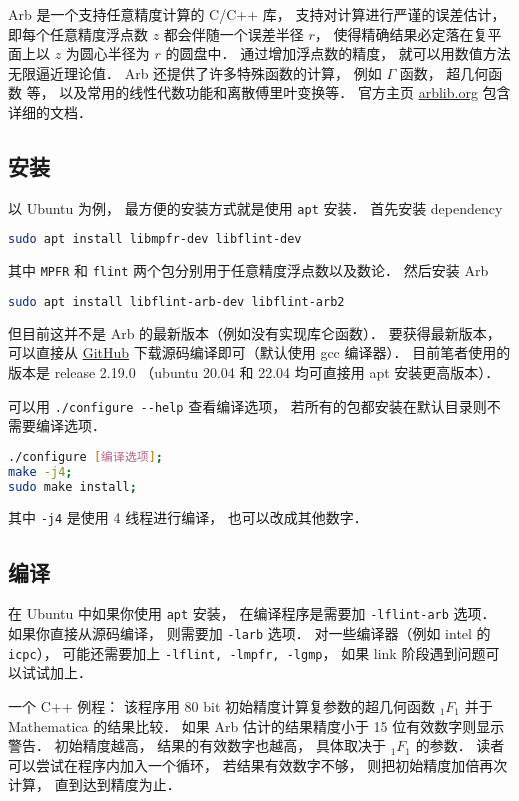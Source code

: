 

Arb 是一个支持任意精度计算的 C/C++ 库， 支持对计算进行严谨的误差估计， 即每个任意精度浮点数 $z$ 都会伴随一个误差半径 $r$， 使得精确结果必定落在复平面上以 $z$ 为圆心半径为 $r$ 的圆盘中． 通过增加浮点数的精度， 就可以用数值方法无限逼近理论值． Arb 还提供了许多特殊函数的计算， 例如 $\Gamma$ 函数， 超几何函数 等， 以及常用的线性代数功能和离散傅里叶变换等． 官方主页 \href{https://arblib.org/}{arblib.org} 包含详细的文档．

\subsection{安装}
以 Ubuntu 为例， 最方便的安装方式就是使用 \verb|apt| 安装． 首先安装 dependency
\begin{lstlisting}[language=bash]
sudo apt install libmpfr-dev libflint-dev
\end{lstlisting}
其中 \verb|MPFR| 和 \verb|flint| 两个包分别用于任意精度浮点数以及数论． 然后安装 Arb
\begin{lstlisting}[language=bash]
sudo apt install libflint-arb-dev libflint-arb2
\end{lstlisting}

但目前这并不是 Arb 的最新版本（例如没有实现库仑函数）． 要获得最新版本， 可以直接从 \href{https://github.com/fredrik-johansson/arb/}{GitHub} 下载源码编译即可（默认使用 gcc 编译器）． 目前笔者使用的版本是 release 2.19.0 （ubuntu 20.04 和 22.04 均可直接用 apt 安装更高版本）．

可以用 \verb|./configure --help| 查看编译选项， 若所有的包都安装在默认目录则不需要编译选项．
\begin{lstlisting}[language=bash]
./configure [编译选项];
make -j4;
sudo make install;
\end{lstlisting}
其中 \verb|-j4| 是使用 4 线程进行编译， 也可以改成其他数字．

\subsection{编译}
在 Ubuntu 中如果你使用 \verb|apt| 安装， 在编译程序是需要加 \verb|-lflint-arb| 选项． 如果你直接从源码编译， 则需要加 \verb|-larb| 选项． 对一些编译器（例如 intel 的 \verb|icpc|）， 可能还需要加上 \verb|-lflint, -lmpfr, -lgmp|， 如果 link 阶段遇到问题可以试试加上．

一个 C++ 例程： 该程序用 80 bit 初始精度计算复参数的超几何函数 $_1F_1$ 并于 Mathematica 的结果比较． 如果 Arb 估计的结果精度小于 15 位有效数字则显示警告． 初始精度越高， 结果的有效数字也越高， 具体取决于 $_1F_1$ 的参数． 读者可以尝试在程序内加入一个循环， 若结果有效数字不够， 则把初始精度加倍再次计算， 直到达到精度为止．

